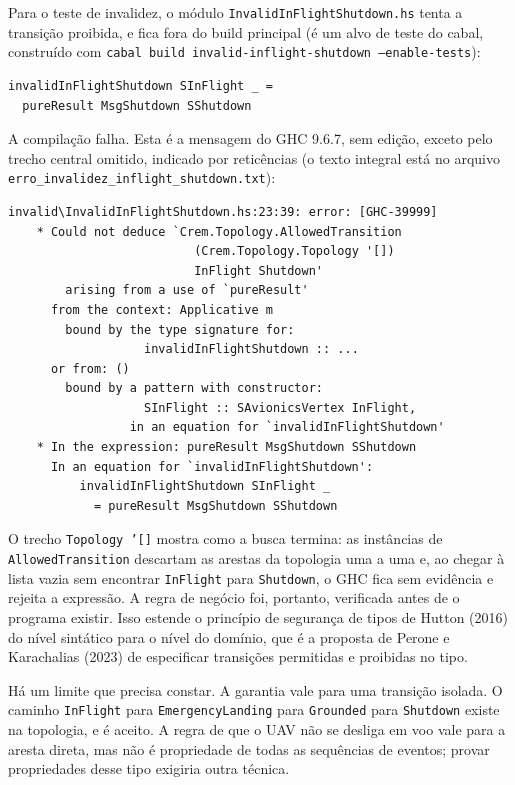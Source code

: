 \documentclass[12pt,a4paper]{article}
\begin{document}
Para o teste de invalidez, o módulo \texttt{InvalidInFlightShutdown.hs} tenta a transição proibida, e fica fora do build principal (é um alvo de teste do cabal, construído com \texttt{cabal build invalid-inflight-shutdown --enable-tests}):

\begin{verbatim}
invalidInFlightShutdown SInFlight _ =
  pureResult MsgShutdown SShutdown
\end{verbatim}

A compilação falha. Esta é a mensagem do GHC 9.6.7, sem edição, exceto pelo trecho central omitido, indicado por reticências (o texto integral está no arquivo \texttt{erro\_invalidez\_inflight\_shutdown.txt}):

\begin{verbatim}
invalid\InvalidInFlightShutdown.hs:23:39: error: [GHC-39999]
    * Could not deduce `Crem.Topology.AllowedTransition
                          (Crem.Topology.Topology '[])
                          InFlight Shutdown'
        arising from a use of `pureResult'
      from the context: Applicative m
        bound by the type signature for:
                   invalidInFlightShutdown :: ...
      or from: ()
        bound by a pattern with constructor:
                   SInFlight :: SAvionicsVertex InFlight,
                 in an equation for `invalidInFlightShutdown'
    * In the expression: pureResult MsgShutdown SShutdown
      In an equation for `invalidInFlightShutdown':
          invalidInFlightShutdown SInFlight _
            = pureResult MsgShutdown SShutdown
\end{verbatim}

O trecho \texttt{Topology '[]} mostra como a busca termina: as instâncias de \texttt{AllowedTransition} descartam as arestas da topologia uma a uma e, ao chegar à lista vazia sem encontrar \texttt{InFlight} para \texttt{Shutdown}, o GHC fica sem evidência e rejeita a expressão. A regra de negócio foi, portanto, verificada antes de o programa existir. Isso estende o princípio de segurança de tipos de Hutton (2016) do nível sintático para o nível do domínio, que é a proposta de Perone e Karachalias (2023) de especificar transições permitidas e proibidas no tipo.

Há um limite que precisa constar. A garantia vale para uma transição isolada. O caminho \texttt{InFlight} para \texttt{EmergencyLanding} para \texttt{Grounded} para \texttt{Shutdown} existe na topologia, e é aceito. A regra de que o UAV não se desliga em voo vale para a aresta direta, mas não é propriedade de todas as sequências de eventos; provar propriedades desse tipo exigiria outra técnica.
\end{document}
